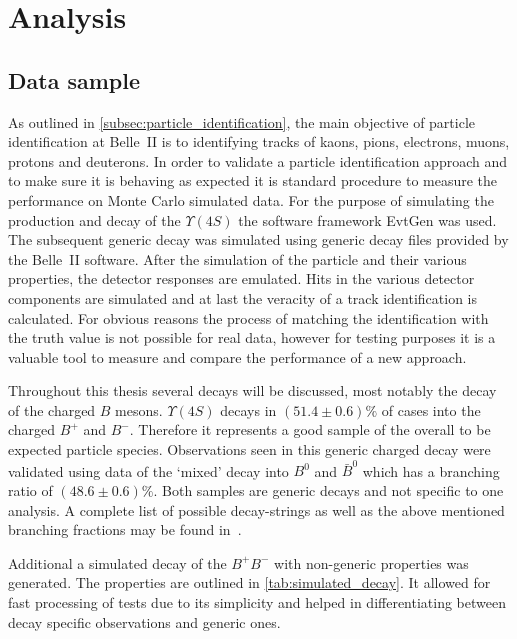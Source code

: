\chapter{Analysis}
\label{chap:analysis}

\section{Data sample}
\label{sec:data_sample}

As outlined in \autoref{subsec:particle_identification}, the main objective of particle identification at Belle~\RN{2} is to identifying tracks of kaons, pions, electrons, muons, protons and deuterons. In order to validate a particle identification approach and to make sure it is behaving as expected it is standard procedure to measure the performance on Monte Carlo simulated data. For the purpose of simulating the production and decay of the $\Upsilon(4S)$ the software framework EvtGen was used. The subsequent generic decay was simulated using generic decay files provided by the Belle~\RN{2} software. After the simulation of the particle and their various properties, the detector responses are emulated. Hits in the various detector components are simulated and at last the veracity of a track identification is calculated. For obvious reasons the process of matching the identification with the truth value is not possible for real data, however for testing purposes it is a valuable tool to measure and compare the performance of a new approach.

Throughout this thesis several decays will be discussed, most notably the decay of the charged $B$ mesons. $\Upsilon(4S)$ decays in $(51.4 \pm 0.6) \%$ of cases into the charged $B^+$ and $B^-$. Therefore it represents a good sample of the overall to be expected particle species. Observations seen in this generic charged decay were validated using data of the `mixed' decay into $B^0$ and $\bar{B}^0$ which has a branching ratio of $(48.6 \pm 0.6) \%$. Both samples are generic decays and not specific to one analysis. A complete list of possible decay-strings as well as the above mentioned branching fractions may be found in~\cite{Patrignani:2016xqp}.

Additional a simulated decay of the $B^+ B^-$ with non-generic properties was generated. The properties are outlined in \autoref{tab:simulated_decay}. It allowed for fast processing of tests due to its simplicity and helped in differentiating between decay specific observations and generic ones.

